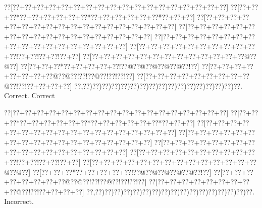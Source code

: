 \documentclass[a5paper]{article}
\begin{document}
\begin{center}
{\goo
\0??[\0??+\0??+\0??+\0??+\0??+\0??+\0??+\0??+\0??+\0??+\0??+\0??+\0??+\0??+\0??+\0??+\0??+\0??]
\0??[\0??+\0??+\0??*\0??+\0??+\0??+\0??+\0??+\0??*\0??+\0??+\0??+\0??+\0??+\0??*\0??+\0??+\0??]
\0??[\0??+\0??+\0??+\0??+\0??+\0??+\0??+\0??+\0??+\0??+\0??+\0??+\0??+\0??+\0??+\0??+\0??+\0??]
\0??[\0??+\0??+\0??+\0??+\0??+\0??+\0??+\0??+\0??+\0??+\0??+\0??+\0??+\0??+\0??+\0??+\0??+\0??]
\0??[\0??+\0??+\0??+\0??+\0??+\0??+\0??+\0??+\0??+\0??+\0??+\0??+\0??+\0??+\0??+\0??+\0??+\0??]
\0??[\0??+\0??+\0??+\0??+\0??+\0??+\0??+\0??+\0??+\0??+\0??!\0??+\0??!\0??+\0??!\0??+\0??]
\0??[\0??+\0??+\0??+\0??+\0??+\0??+\0??+\0??+\0??+\0??+\0??+\0??+\0??@\0??@\0??]
\0??[\0??+\0??+\0??*\0??+\0??+\0??+\0??+\0??!\0??@\0??@\0??@\0??@\0??@\0??!\0??]
\0??[\0??+\0??+\0??+\0??+\0??+\0??+\0??+\0??@\0??@\0??!\0??!\0??@\0??!\0??!\0??!\0??]
\0??[\0??+\0??+\0??+\0??+\0??+\0??+\0??+\0??+\0??@\0??!\0??!\0??+\0??+\0??+\0??]
\0??,\0??)\0??)\0??)\0??)\0??)\0??)\0??)\0??)\0??)\0??)\0??)\0??)\0??)\0??)\0??)\0??)\0??.
}
Correct. Correct

\end{center}
\begin{center}
{\goo
\0??[\0??+\0??+\0??+\0??+\0??+\0??+\0??+\0??+\0??+\0??+\0??+\0??+\0??+\0??+\0??+\0??+\0??+\0??]
\0??[\0??+\0??+\0??*\0??+\0??+\0??+\0??+\0??+\0??*\0??+\0??+\0??+\0??+\0??+\0??*\0??+\0??+\0??]
\0??[\0??+\0??+\0??+\0??+\0??+\0??+\0??+\0??+\0??+\0??+\0??+\0??+\0??+\0??+\0??+\0??+\0??+\0??]
\0??[\0??+\0??+\0??+\0??+\0??+\0??+\0??+\0??+\0??+\0??+\0??+\0??+\0??+\0??+\0??+\0??+\0??+\0??]
\0??[\0??+\0??+\0??+\0??+\0??+\0??+\0??+\0??+\0??+\0??+\0??+\0??+\0??+\0??+\0??+\0??+\0??+\0??]
\0??[\0??+\0??+\0??+\0??+\0??+\0??+\0??+\0??+\0??+\0??+\0??!\0??+\0??!\0??+\0??!\0??+\0??]
\0??[\0??+\0??+\0??+\0??+\0??+\0??+\0??+\0??+\0??+\0??+\0??+\0??+\0??+\0??@\0??@\0??]
\0??[\0??+\0??+\0??*\0??+\0??+\0??+\0??+\0??!\0??@\0??@\0??@\0??@\0??@\0??!\0??]
\0??[\0??+\0??+\0??+\0??+\0??+\0??+\0??+\0??@\0??@\0??!\0??!\0??@\0??!\0??!\0??!\0??]
\0??[\0??+\0??+\0??+\0??+\0??+\0??+\0??+\0??+\0??@\0??!\0??!\0??+\0??+\0??+\0??]
\0??,\0??)\0??)\0??)\0??)\0??)\0??)\0??)\0??)\0??)\0??)\0??)\0??)\0??)\0??)\0??)\0??)\0??.
}
Incorrect. 

\end{center}
\end{document}
